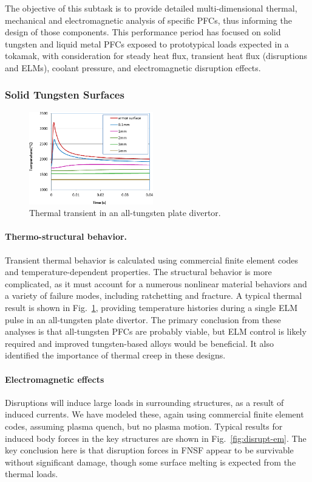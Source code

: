 The objective of this subtask is to provide detailed multi-dimensional
thermal, mechanical and electromagnetic analysis of specific \glspl{PFC}, thus
informing the design of those components.  This performance period has focused
on solid tungsten and liquid metal \glspl{PFC} exposed to prototypical loads
expected in a tokamak, with consideration for steady heat flux, transient heat
flux (disruptions and \glspl{ELM}), coolant pressure, and electromagnetic
disruption effects.


\subsubsection{Solid Tungsten Surfaces}

\begin{figure}
\centering
\includegraphics[width=0.48\textwidth]{imgs/elm-thermal.png}
\caption{\label{fig:elm-thermal}Thermal transient in an all-tungsten plate divertor.}
\end{figure}

\paragraph{Thermo-structural behavior.} Transient thermal behavior is
calculated using commercial finite element codes and temperature-dependent
properties. The structural behavior is more complicated, as it must account
for a numerous nonlinear material behaviors and a variety of failure modes,
including ratchetting and fracture. A typical thermal result is shown in
Fig.\ \ref{fig:elm-thermal}, providing temperature histories during a single
\gls{ELM} pulse in an all-tungsten plate divertor. The primary conclusion from
these analyses is that all-tungsten \glspl{PFC} are probably viable, but
\gls{ELM} control is likely required and improved tungsten-based alloys would
be beneficial. It also identified the importance of thermal creep in these
designs.

\paragraph{Electromagnetic effects} Disruptions will induce large loads in
surrounding structures, as a result of induced currents. We have modeled
these, again using commercial finite element codes, assuming plasma quench,
but no plasma motion. Typical results for induced body forces in the key
structures are shown in Fig.\ \ref{fig:disrupt-em}. The key conclusion here is
that disruption forces in FNSF appear to be survivable without significant
damage, though some surface melting is expected from the thermal loads.

